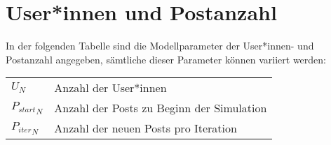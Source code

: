 \section{User*innen und Postanzahl}

In der folgenden Tabelle sind die Modellparameter der User*innen- und Postanzahl angegeben, sämtliche dieser Parameter können variiert werden:

\begin{table}[!htbp]
	\begin{tabularx}{\textwidth}{lX}
		$U_N$&  Anzahl der User*innen\\
		${P_{start}}_{N}$ & Anzahl der Posts zu Beginn der Simulation \\
		${P_{iter}}_{N}$ & Anzahl der neuen Posts pro Iteration\\ 
	\end{tabularx}
\end{table}
